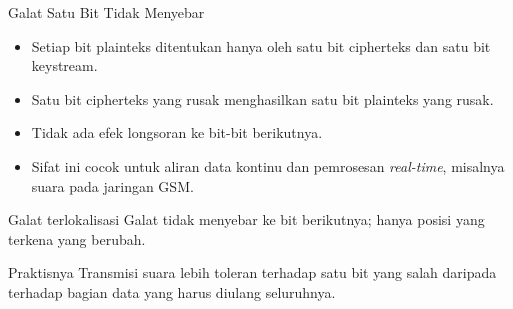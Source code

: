 \documentclass[aspectratio=169,11pt]{beamer}
\begin{document}
\begin{frame}{Galat Satu Bit Tidak Menyebar}
    \footnotesize
    \begin{itemize}
        \item Setiap bit plainteks ditentukan hanya oleh satu bit cipherteks
              dan satu bit keystream.
        \item Satu bit cipherteks yang rusak menghasilkan satu bit plainteks
              yang rusak.
        \item Tidak ada efek longsoran ke bit-bit berikutnya.
        \item Sifat ini cocok untuk aliran data kontinu dan pemrosesan
              \textit{real-time}, misalnya suara pada jaringan GSM.
    \end{itemize}
    \vspace{0.1cm}
    \begin{block}{Galat terlokalisasi}
        Galat tidak menyebar ke bit berikutnya; hanya posisi yang terkena
        yang berubah.
    \end{block}
    \begin{exampleblock}{Praktisnya}
        Transmisi suara lebih toleran terhadap satu bit yang salah daripada
        terhadap bagian data yang harus diulang seluruhnya.
    \end{exampleblock}
\end{frame}
\end{document}
